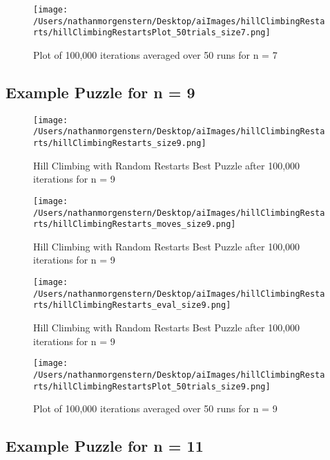 \documentclass{report}
\begin{document}
	\begin{figure}[H]
	\centering
	\texttt{[image: /Users/nathanmorgenstern/Desktop/aiImages/hillClimbingRestarts/hillClimbingRestartsPlot\_50trials\_size7.png]}
	\caption{Plot of 100,000 iterations averaged over 50 runs for n = 7}
	\label{fig: Plot of 100,000 iterations averaged over 50 runs for n = 7}
	\end{figure}
	
\subsection{Example Puzzle for n = 9}
\begin{figure}[H]
	\centering
	\texttt{[image: /Users/nathanmorgenstern/Desktop/aiImages/hillClimbingRestarts/hillClimbingRestarts\_size9.png]}
	\caption{Hill Climbing with Random Restarts Best Puzzle after 100,000 iterations for n = 9} 
	\label{fig: Hill Climbing with Random Restarts Best Puzzle after 100,000 iterations for n = 9}
	\end{figure}
	
	\begin{figure}[H]
	\centering
	\texttt{[image: /Users/nathanmorgenstern/Desktop/aiImages/hillClimbingRestarts/hillClimbingRestarts\_moves\_size9.png]}
	\caption{Hill Climbing with Random Restarts Best Puzzle after 100,000 iterations for n = 9} 
	\label{fig: Hill Climbing with Random Restarts Best Puzzle after 100,000 iterations for n = 9}
	\end{figure}

	\begin{figure}[H]
	\centering
	\texttt{[image: /Users/nathanmorgenstern/Desktop/aiImages/hillClimbingRestarts/hillClimbingRestarts\_eval\_size9.png]}
	\caption{Hill Climbing with Random Restarts Best Puzzle after 100,000 iterations for n = 9} 
	\label{fig: Hill Climbing with Random Restarts Best Puzzle after 100,000 iterations for n = 9}
	\end{figure}

	\begin{figure}[H]
	\centering
	\texttt{[image: /Users/nathanmorgenstern/Desktop/aiImages/hillClimbingRestarts/hillClimbingRestartsPlot\_50trials\_size9.png]}
	\caption{Plot of 100,000 iterations averaged over 50 runs for n = 9}
	\label{fig: Plot of 100,000 iterations averaged over 50 runs for n = 9}
	\end{figure}
\subsection{Example Puzzle for n = 11}
\end{document}
